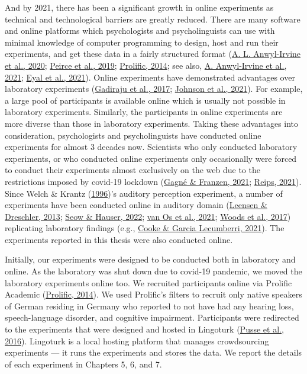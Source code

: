 \documentclass[a4paper, nobind]{templates/ociamthesis}
\begin{document}
And by 2021, there has been a significant growth in online experiments as technical and technological barriers are greatly reduced.
There are many software and online platforms which psychologists and psycholinguists can use with minimal knowledge of computer programming
to design, host and run their experiments, and get these data in a fairly structured format (\protect\hyperlink{ref-Anwylirvine2020}{A. L. Anwyl-Irvine et al., 2020}; \protect\hyperlink{ref-Peirce2019}{Peirce et al., 2019}; \protect\hyperlink{ref-Prolific}{Prolific, 2014}; see also, \protect\hyperlink{ref-Anwylirvine2021}{A. Anwyl-Irvine et al., 2021}; \protect\hyperlink{ref-Eyal2021}{Eyal et al., 2021}).
Online experiments have demonstrated advantages over laboratory experiments (\protect\hyperlink{ref-Gadiraju2017}{Gadiraju et al., 2017}; \protect\hyperlink{ref-Johnson2021}{Johnson et al., 2021}).
For example, a large pool of participants is available online which is usually not possible in laboratory experiments.
Similarly, the participants in online experiments are more diverse than those in laboratory experiments.
Taking these advantages into consideration, psychologists and psycholinguists have conducted online experiments for almost 3 decades now.
Scientists who only conducted laboratory experiments, or who conducted online experiments only occasionally were forced to conduct their experiments almost exclusively on the web due to the restrictions imposed by covid-19 lockdown (\protect\hyperlink{ref-Gagne2021}{Gagné \& Franzen, 2021}; \protect\hyperlink{ref-Reips2021}{Reips, 2021}).
Since Welch \& Krantz (\protect\hyperlink{ref-Welch1996}{1996})'s auditory perception experiment, a number of experiments have been conducted online in auditory domain (\protect\hyperlink{ref-Leensen2013}{Leensen \& Dreschler, 2013}; \protect\hyperlink{ref-Seow2022}{Seow \& Hauser, 2022}; \protect\hyperlink{ref-vanOs2021}{van Os et al., 2021}; \protect\hyperlink{ref-Woods2017}{Woods et al., 2017}) replicating laboratory findings (e.g., \protect\hyperlink{ref-Cooke2021}{Cooke \& Garcia Lecumberri, 2021}).
The experiments reported in this thesis were also conducted online.

Initially, our experiments were designed to be conducted both in laboratory and online.
As the laboratory was shut down due to covid-19 pandemic, we moved the laboratory experiments online too.
We recruited participants online via Prolific Academic (\protect\hyperlink{ref-Prolific}{Prolific, 2014}).
We used Prolific's filters to recruit only native speakers of German residing in Germany
who reported to not have had any hearing loss, speech-language disorder, and cognitive impairment.
Participants were redirected to the experiments that were designed and hosted in Lingoturk (\protect\hyperlink{ref-Pusse2016}{Pusse et al., 2016}).
Lingoturk is a local hosting platform that manages crowdsourcing experiments --- it runs the experiments and stores the data.
We report the details of each experiment in Chapters 5, 6, and 7.
\end{document}

